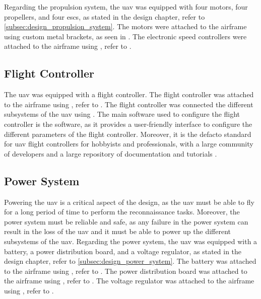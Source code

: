 Regarding the propulsion system, the \gls{uav} was equipped with four  motors, four  propellers, and four  \glspl{esc}, as stated in the design chapter, refer to \cref{subsec:design_propulsion_system}. The motors were attached to the airframe using custom metal brackets, as seen in . The electronic speed controllers were attached to the airframe using , refer to .



\subsection{Flight Controller}\label{subsec:implementation_flight_controller}

The \gls{uav} was equipped with a  flight controller. The flight controller was attached to the airframe using , refer to . The flight controller was connected the different subsystems of the \gls{uav} using . The main software used to configure the flight controller is the  software, as it provides a user-friendly interface to configure the different parameters of the flight controller. Moreover, it is the defacto standard for \gls{uav} flight controllers for hobbyists and professionals, with a large community of developers  and a large repository of documentation and tutorials .


\subsection{Power System}\label{subsec:implementation_power_system}

Powering the \gls{uav} is a critical aspect of the design, as the \gls{uav} must be able to fly for a long period of time to perform the reconnaissance tasks. Moreover, the power system must be reliable and safe, as any failure in the power system can result in the loss of the \gls{uav} and it must be able to power up the different subsystems of the \gls{uav}. Regarding the power system, the \gls{uav} was equipped with a  battery, a  power distribution board, and a  voltage regulator, as stated in the design chapter, refer to \cref{subsec:design_power_system}. The battery was attached to the airframe using , refer to . The power distribution board was attached to the airframe using , refer to . The voltage regulator was attached to the airframe using , refer to .

